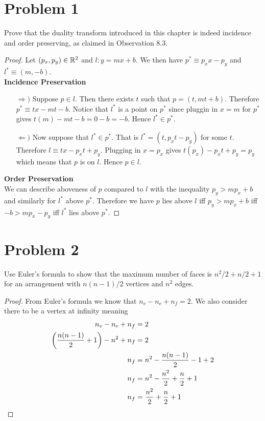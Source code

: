 \documentclass[12pt]{extarticle}
\begin{document}
\section*{Problem 1}
Prove that the duality transform introduced in this chapter is indeed incidence and order preserving, as claimed in Observation 8.3.

\begin{proof}
    Let $(p_x,p_y) \in \mathbb{R}^2$ and $l : y = mx + b$. We then have $p^* \equiv p_x x - p_y$ and $l^* \equiv (m, -b)$.
    \\

    \noindent
    \textbf{Incidence Preservation}
    \begin{enumerate}
        \item[$\Rightarrow)$] Suppose $p \in l$. Then there exists $t$ such that $p = (t, mt + b)$. Therefore $p^* \equiv tx - mt - b$. Notice that $l^*$ is a point on $p^*$ since pluggin in $x=m$ for $p^*$ gives $t(m) - mt - b = 0 - b = -b$. Hence $l^* \in p^*$.
        \item[$\Leftarrow)$] Now suppose that $l^* \in p^*$. That is $l^* = (t, p_x t - p_y)$ for some $t$. Therefore $l \equiv tx - p_x t + p_y$. Plugging in $x = p_x$ gives $t(p_x) - p_x t + p_y = p_y$ which means that $p$ is on $l$. Hence $p \in l$.
    \end{enumerate}

    \textbf{Order Preservation}
    \\

    We can describe aboveness of $p$ compared to $l$ with the inequality $p_y > m p_x + b$ and similarly for $l^*$ above $p^*$. Therefore we have $p$ lies above $l$ iff  $p_y > mp_x + b$ iff $-b > mp_x - p_y$ iff $l^*$ lies above $p^*$.
\end{proof}

\section*{Problem 2}
Use Euler's formula to show that the maximum number of faces is $n^2 /2 + n/2 + 1$ for an arrangement with $n(n - 1)/2$ vertices and $n^2$ edges.

\begin{proof}
    From Euler's formula we know that $n_v - n_e + n_f = 2$. We also consider there to be a vertex at infinity meaning
    \begin{align*}
        n_v - n_e + n_f &= 2 \\
        \qty(\frac{n(n-1)}{2} + 1) - n^2 + n_f &= 2 \\
        n_f &= n^2 - \frac{n(n-1)}{2} - 1 + 2 \\
        n_f &= n^2 - \frac{n^2}{2} + \frac{n}{2} + 1 \\
        n_f &= \frac{n^2}{2} + \frac{n}{2} + 1 \qedhere
    \end{align*}
\end{proof}
\end{document}
